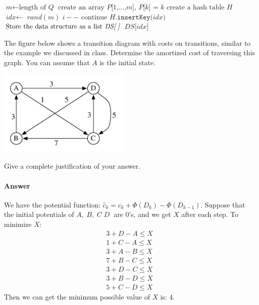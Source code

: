 \documentclass[11pt]{article}
\begin{document}
\begin{algorithm}
\caption{$Random Key$}
\begin{algorithmic}[1]
\State $\textit{m} \gets \text{length of } \textit{Q}$
\State $\text{create an array } \textit{P[1,...,m], P[k] = k}$
\State $\text{create a hash table } \textit{H}$
    \State $\textit{idx} \gets$ $rand(m)$
        \State $i--$
        \State $\text{continue}$
    \Else
        \State $\textit{H}.\texttt{insertKey}(\textit{idx}\texttt{)}$
    \EndIf
\EndFor
\EndProcedure
{}
\State $\text{Store the data structure as a list }\textit{DS[\;]}$
\Return $\textit{DS[idx]}$
\EndProcedure
\EndFunction
\end{algorithmic}
\end{algorithm}

\newpage

\begin{problem} 
The figure below shows a transition diagram with costs on transitions,
similar to the example we discussed in class.
Determine the amortized cost of traversing this graph.
You can assume that $A$ is the initial state.

\noindent
\begin{center}
\includegraphics[width=2.5in]{amortized.pdf} %
\end{center}

Give a complete justification of your answer.

\paragraph{Answer}
We have the potential function: $\hat c_k = c_k + \Phi(D_k) - \Phi(D_{k-1})$. Suppose that the initial potentials of $A,\;B,\;C\;D\;$ are 0's, and we get $X$ after each step. To minimize $X$:\\
\begin{gather*}
    3 + D - A \leq X \\
    1 + C - A \leq X \\
    3 + A - B \leq X \\
    7 + B - C \leq X \\
    3 + D - C \leq X \\
    3 + B - D \leq X \\
    5 + C - D \leq X 
\end{gather*}
Then we can get the minimum possible value of $X$ is: $4$.

\end{problem}
\end{document}
